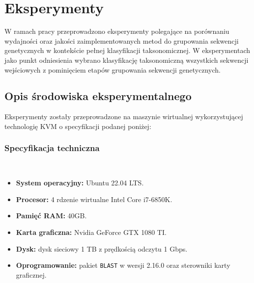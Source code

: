 \clearpage 
\section{Eksperymenty}

    W ramach pracy przeprowadzono eksperymenty polegające na porównaniu wydajności oraz jakości zaimplementowanych metod do grupowania sekwencji genetycznych w kontekście pełnej klasyfikacji taksonomicznej. W eksperymentach jako punkt odniesienia wybrano klasyfikację taksonomiczną wszystkich sekwencji wejściowych z pominięciem etapów grupowania sekwencji genetycznych.

    \subsection{Opis środowiska eksperymentalnego}

        Eksperymenty zostały przeprowadzone na maszynie wirtualnej wykorzystującej technologię KVM o specyfikacji podanej poniżej:

        \subsubsection{Specyfikacja techniczna}\

            \begin{itemize}
                \item {
                    \textbf{System operacyjny:} Ubuntu 22.04 LTS.
                }
                \item {
                    \textbf{Procesor:} 4 rdzenie wirtualne Intel Core i7-6850K.
                }
                \item {
                    \textbf{Pamięć RAM:} 40GB.
                }
                \item {
                    \textbf{Karta graficzna:} Nvidia GeForce GTX 1080 TI.
                }
                \item {
                    \textbf{Dysk:} dysk sieciowy 1 TB z prędkością odczytu 1 Gbps.
                }
                \item {
                    \textbf{Oprogramowanie:} pakiet \texttt{BLAST} w wersji 2.16.0 oraz sterowniki karty graficznej.
                }
            \end{itemize}

